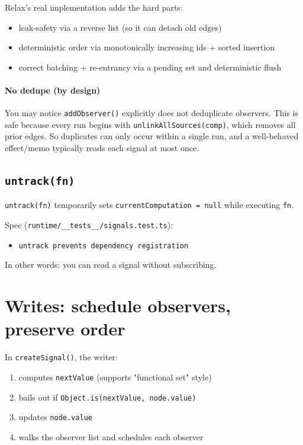 Relax’s real implementation adds the hard parts:

\begin{itemize}
  \item leak-safety via a reverse list (so it can detach old edges)
  \item deterministic order via monotonically increasing ids + sorted insertion
  \item correct batching + re-entrancy via a pending set and deterministic flush
\end{itemize}

\paragraph{No dedupe (by design)}

You may notice \texttt{addObserver()} explicitly does not deduplicate observers.
This is safe because every run begins with \texttt{unlinkAllSources(comp)}, which removes all prior edges.
So duplicates can only occur within a single run, and a well-behaved effect/memo typically reads each signal at most once.

\subsection{\texttt{untrack(fn)}}

\texttt{untrack(fn)} temporarily sets \texttt{currentComputation = null} while executing \texttt{fn}.

Spec (\texttt{runtime/\_\_tests\_\_/signals.test.ts}):

\begin{itemize}
  \item \texttt{untrack prevents dependency registration}
\end{itemize}

In other words: you can read a signal without subscribing.

\section{Writes: schedule observers, preserve order}

In \texttt{createSignal()}, the writer:

\begin{enumerate}
  \item computes \texttt{nextValue} (supports "functional set" style)
  \item bails out if \texttt{Object.is(nextValue, node.value)}
  \item updates \texttt{node.value}
  \item walks the observer list and schedules each observer
\end{enumerate}

